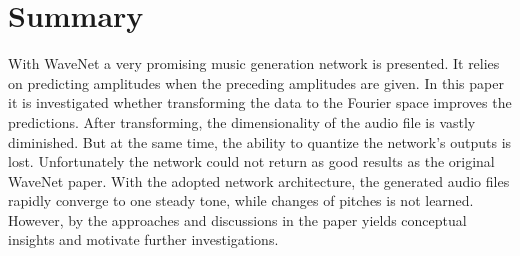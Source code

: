 \documentclass[10pt,conference,compsocconf]{IEEEtran}
\begin{document}
\section{Summary}
With WaveNet a very promising music generation network is presented. It relies on predicting amplitudes when the preceding amplitudes are given. In this paper it is investigated whether transforming the data to the Fourier space improves the predictions. After transforming, the dimensionality of the audio file is vastly diminished. But at the same time, the ability to quantize the network's outputs is lost. Unfortunately the network could not return as good results as the original WaveNet paper. With the adopted network architecture, the generated audio files rapidly converge to one steady tone, while changes of pitches is not learned. However, by the approaches and discussions in the paper yields conceptual insights and motivate further investigations.



\end{document}

